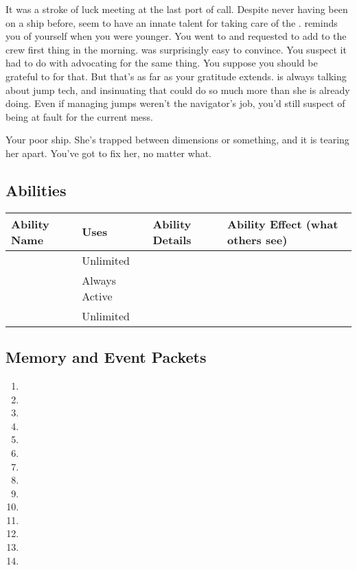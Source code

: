 \documentclass[char]{TMFHope}
\begin{document}
It was a stroke of luck meeting \cBoy{} at the last port of call. Despite never having been on a ship before, \cBoy{\they} seem\cBoy{\plural} to have an innate talent for taking care of the \pNew{}. \cBoy{} reminds you of yourself when you were younger. You went to \cCap{} and requested to add \cBoy{} to the crew first thing in the morning. \cCap{} was surprisingly easy to convince. You suspect it had to do with \cNav{} advocating for the same thing. You suppose you should be grateful to \cNav{\them} for that. But that's as far as your gratitude extends. \cNav{} is always talking about jump tech, and insinuating that \pNew{} could do so much more than she is already doing. Even if managing jumps weren't the navigator's job, you'd still suspect \cNav{} of being at fault for the current mess.

Your poor ship. She's trapped between dimensions or something, and it is tearing her apart. You've got to fix her, no matter what.

\subsection*{Abilities}
\begin{tabular}{|p{2.5cm}|p{1.5cm}|p{10cm}|p{2cm}|} 
 \hline
 \textbf{Ability Name} & \textbf{Uses} & \textbf{Ability Details} & \textbf{Ability Effect (what others see)} \\ 
\hline 
 \aEngineering{\MYname} & Unlimited & \aEngineering{\MYtext} & \aEngineering{\MYeffect} \\ 
\hline
 \aEyesight{\MYname} & Always Active & \aEyesight{\MYtext} & \aEyesight{\MYeffect}\\ 
 \hline
	\aPractice{\MYname} & Unlimited & \aPractice{\MYtext} & \aPractice{\MYeffect} \\ 
\hline
\end{tabular}

\subsection*{Memory and Event Packets}
\begin{enumerate}
	\item \mPractice{\MYname}
	\item \mEAlpha{\MYname}
	\item \mEngineerOne{\MYname}
	\item \mRepairsOne{\MYname}
	\item \mRepairsThree{\MYname}
	\item \mRepairsFive{\MYname}
	\item \mShipLog{\MYname}
	\item \mBroom{\MYname}
	\item \mLab{\MYname}
	\item \mPatient{\MYname}
	\item \mKitchen{\MYname}
	\item \mWeight{\MYname}
	\item \mTheater{\MYname}
	\item \mCrates{\MYname}
\end{enumerate}
\end{document}
